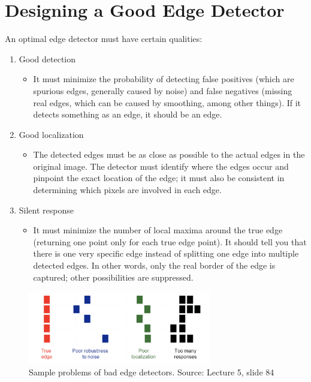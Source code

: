 \documentclass{article}
\begin{document}
\section{Designing a Good Edge Detector}
An optimal edge detector must have certain qualities:
\begin{enumerate}
    \item Good detection
    \begin{itemize}
        \item It must minimize the probability of detecting false positives (which are spurious edges, generally caused by noise) and false negatives (missing real edges, which can be caused by smoothing, among other things). If it detects something as an edge, it should be an edge.
    \end{itemize}
    \item Good localization
    \begin{itemize}
        \item The detected edges must be as close as possible to the actual edges in the original image. The detector must identify where the edges occur and pinpoint the exact location of the edge; it must also be consistent in determining which pixels are involved in each edge.
    \end{itemize}
    \item Silent response
    \begin{itemize}
        \item It must minimize the number of local maxima around the true edge (returning one point only for each true edge point). It should tell you that there is one very specific edge instead of splitting one edge into multiple detected edges. In other words, only the real border of the edge is captured; other possibilities are suppressed.
    \end{itemize}
\end{enumerate}

\begin{figure}[H]
\centering
\includegraphics[width=8cm]{fei-fei_detection.png}
\caption{Sample problems of bad edge detectors. Source: Lecture 5, slide 84}
\end{figure}



\small


\end{document}
